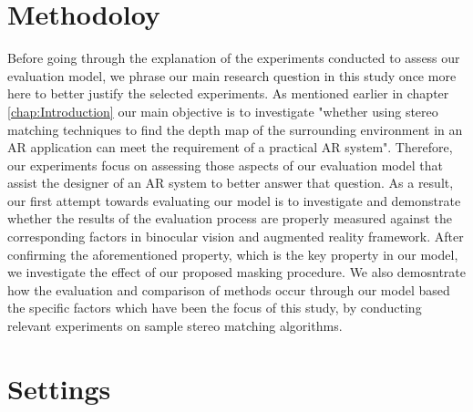 \section{Methodoloy}
Before going through the explanation of the experiments conducted to assess our evaluation model, we phrase our main research question in this
study once more here to better justify the selected experiments. 
As mentioned earlier in chapter \ref{chap:Introduction} our main objective is to investigate "whether using 
stereo matching techniques to find the depth map of the 
surrounding environment in an AR application can meet the requirement of a practical AR system". Therefore, our experiments focus 
on assessing those aspects of our evaluation model that assist the designer of an AR system to better answer that question.
As a result, our first attempt towards evaluating our model is to investigate and demonstrate whether the results of the evaluation process 
are properly measured against the corresponding factors in binocular vision and augmented reality framework.
After confirming the aforementioned property, which is the key property in our model, we investigate the effect of our proposed masking 
procedure. We also demosntrate how the evaluation and comparison of methods occur through our model based the specific factors
which have been the focus of this study, by conducting relevant experiments on sample stereo matching algorithms.

\section{Settings}



